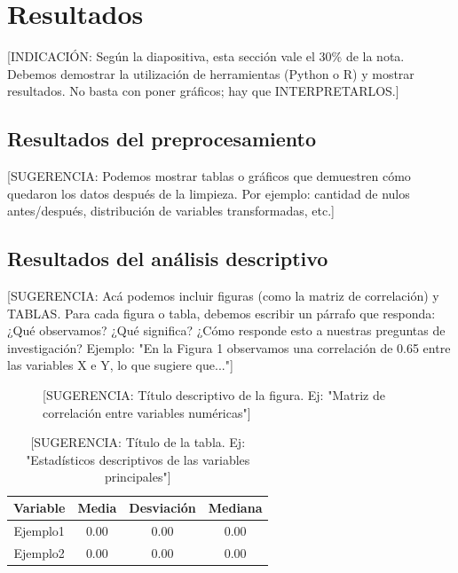 \section{Resultados}

[INDICACIÓN: Según la diapositiva, esta sección vale el 30\% de la nota. Debemos demostrar la utilización de herramientas (Python o R) y mostrar resultados. No basta con poner gráficos; hay que INTERPRETARLOS.]

\subsection{Resultados del preprocesamiento}

[SUGERENCIA: Podemos mostrar tablas o gráficos que demuestren cómo quedaron los datos después de la limpieza. Por ejemplo: cantidad de nulos antes/después, distribución de variables transformadas, etc.]

\subsection{Resultados del análisis descriptivo}

[SUGERENCIA: Acá podemos incluir figuras (como la matriz de correlación) y TABLAS. Para cada figura o tabla, debemos escribir un párrafo que responda: ¿Qué observamos? ¿Qué significa? ¿Cómo responde esto a nuestras preguntas de investigación? Ejemplo: "En la Figura 1 observamos una correlación de 0.65 entre las variables X e Y, lo que sugiere que..."]

\begin{figure}[htbp]
\caption{[SUGERENCIA: Título descriptivo de la figura. Ej: "Matriz de correlación entre variables numéricas"]}
\label{fig1}
\end{figure}

\begin{table}[htbp]
\caption{[SUGERENCIA: Título de la tabla. Ej: "Estadísticos descriptivos de las variables principales"]}
\begin{center}
\begin{tabular}{|c|c|c|c|}
\hline
\textbf{Variable} & \textbf{Media} & \textbf{Desviación} & \textbf{Mediana} \\
\hline
Ejemplo1 & 0.00 & 0.00 & 0.00 \\
\hline
Ejemplo2 & 0.00 & 0.00 & 0.00 \\
\hline
\end{tabular}
\label{tab1}
\end{center}
\end{table}

